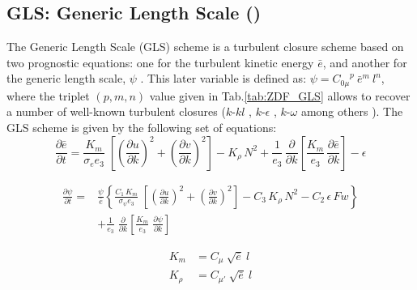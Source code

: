 \documentclass[../main/NEMO_manual]{subfiles}
\begin{document}
\subsection[GLS: Generic Length Scale (\forcode{ln_zdfgls})]{GLS: Generic Length Scale (\protect{})}
\label{subsec:ZDF_gls}

\begin{listing}
  \caption{}
  \label{lst:namzdf_gls}
\end{listing}

The Generic Length Scale (GLS) scheme is a turbulent closure scheme based on two prognostic equations:
one for the turbulent kinetic energy $\bar {e}$, and another for the generic length scale,
$\psi$ \citep{umlauf.burchard_JMR03, umlauf.burchard_CSR05}.
This later variable is defined as: $\psi = {C_{0\mu}}^{p} \ {\bar{e}}^{m} \ l^{n}$,
where the triplet $(p, m, n)$ value given in Tab.\autoref{tab:ZDF_GLS} allows to recover a number of
well-known turbulent closures ($k$-$kl$ \citep{mellor.yamada_RG82}, $k$-$\epsilon$ \citep{rodi_JGR87},
$k$-$\omega$ \citep{wilcox_AJ88} among others \citep{umlauf.burchard_JMR03,kantha.carniel_JMR03}).
The GLS scheme is given by the following set of equations:
\begin{equation}
  \label{eq:ZDF_gls_e}
  \frac{\partial \bar{e}}{\partial t} =
  \frac{K_m}{\sigma_e e_3 }\;\left[ {\left( \frac{\partial u}{\partial k} \right)^2
      +\left( \frac{\partial v}{\partial k} \right)^2} \right]
  -K_\rho \,N^2
  +\frac{1}{e_3}\,\frac{\partial}{\partial k} \left[ \frac{K_m}{e_3}\,\frac{\partial \bar{e}}{\partial k} \right]
  - \epsilon
\end{equation}

\[
  \begin{split}
    \frac{\partial \psi}{\partial t} =& \frac{\psi}{\bar{e}} \left\{
      \frac{C_1\,K_m}{\sigma_{\psi} {e_3}}\;\left[ {\left( \frac{\partial u}{\partial k} \right)^2
          +\left( \frac{\partial v}{\partial k} \right)^2} \right]
      - C_3 \,K_\rho\,N^2   - C_2 \,\epsilon \,Fw   \right\}             \\
    &+\frac{1}{e_3}  \;\frac{\partial }{\partial k}\left[ {\frac{K_m}{e_3 }
        \;\frac{\partial \psi}{\partial k}} \right]\;
  \end{split}
\]

\[
  \begin{split}
    K_m    &= C_{\mu} \ \sqrt {\bar{e}} \ l         \\
    K_\rho &= C_{\mu'}\ \sqrt {\bar{e}} \ l
  \end{split}
\]
\end{document}
